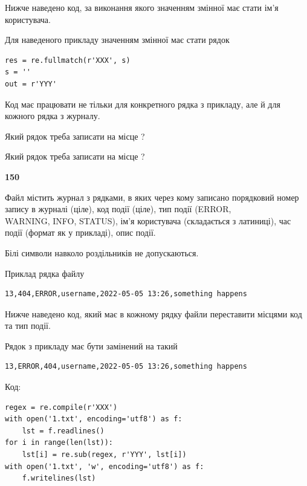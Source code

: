 Нижче наведено код, за виконання якого значенням змінної  має стати ім'я користувача.

Для наведеного прикладу значенням змінної  має стати рядок 



\begin{verbatim}
res = re.fullmatch(r'XXX', s)
s = ''
out = r'YYY'
\end{verbatim}


Код має працювати не тільки для конкретного рядка з прикладу, але й для кожного рядка з журналу.




Який рядок треба записати на місце  ?\par
\vspace{5mm}


Який рядок треба записати на місце  ?\par


\newpage

{\begin {center}\textbf{ 150}\end {center}}\par
Файл  містить журнал з рядками, в яких через кому записано поряд\-ко\-вий номер запису в журналі (ціле), код події (ціле), тип події (ERROR,\\ WARNING, INFO, STATUS), ім'я користувача (складається з латиниці), час події (фор\-мат як у прикладі), опис події.

Білі символи навколо роздільників не допускаються.

Приклад рядка файлу



\begin{verbatim}
13,404,ERROR,username,2022-05-05 13:26,something happens
\end{verbatim}


Нижче наведено код, який має в кожному рядку файли переставити місцями код та тип події.

Рядок з прикладу має бути замінений на такий



\begin{verbatim}
13,ERROR,404,username,2022-05-05 13:26,something happens
\end{verbatim}




Код:



\begin{verbatim}
regex = re.compile(r'XXX')
with open('1.txt', encoding='utf8') as f:
    lst = f.readlines()
for i in range(len(lst)):
    lst[i] = re.sub(regex, r'YYY', lst[i])
with open('1.txt', 'w', encoding='utf8') as f:
    f.writelines(lst)
\end{verbatim}







